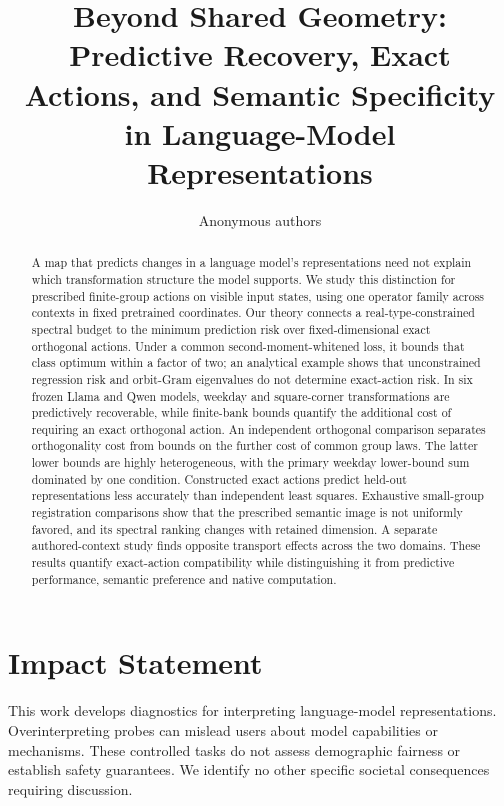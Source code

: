 \documentclass[10pt]{article}
\title{Beyond Shared Geometry: Predictive Recovery, Exact Actions, and Semantic Specificity in Language-Model Representations}
\author{Anonymous authors}
\begin{document}
\maketitle
\raggedbottom

\begin{abstract}
A map that predicts changes in a language model's representations need not explain which transformation structure the model supports. We study this distinction for prescribed finite-group actions on visible input states, using one operator family across contexts in fixed pretrained coordinates. Our theory connects a real-type-constrained spectral budget to the minimum prediction risk over fixed-dimensional exact orthogonal actions. Under a common second-moment-whitened loss, it bounds that class optimum within a factor of two; an analytical example shows that unconstrained regression risk and orbit-Gram eigenvalues do not determine exact-action risk. In six frozen Llama and Qwen models, weekday and square-corner transformations are predictively recoverable, while finite-bank bounds quantify the additional cost of requiring an exact orthogonal action. An independent orthogonal comparison separates orthogonality cost from bounds on the further cost of common group laws. The latter lower bounds are highly heterogeneous, with the primary weekday lower-bound sum dominated by one condition. Constructed exact actions predict held-out representations less accurately than independent least squares. Exhaustive small-group registration comparisons show that the prescribed semantic image is not uniformly favored, and its spectral ranking changes with retained dimension. A separate authored-context study finds opposite transport effects across the two domains. These results quantify exact-action compatibility while distinguishing it from predictive performance, semantic preference and native computation.
\end{abstract}








\FloatBarrier
\label{sec:main-end}

\section*{Impact Statement}
This work develops diagnostics for interpreting language-model representations. Overinterpreting probes can mislead users about model capabilities or mechanisms. These controlled tasks do not assess demographic fairness or establish safety guarantees. We identify no other specific societal consequences requiring discussion.
\end{document}

